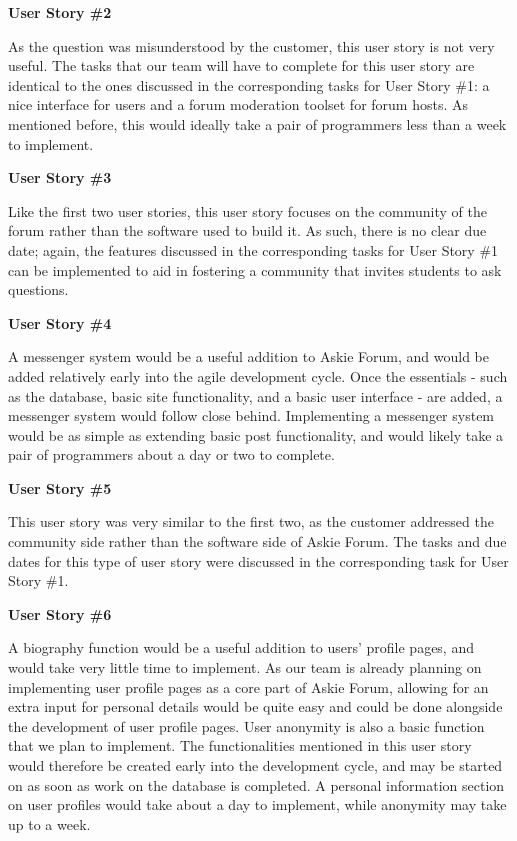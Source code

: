 \documentclass[12pt]{article}
\begin{document}
\textbf{User Story \#2}
\begin{flushleft}
As the question was misunderstood by the customer, this user story is not very useful. The tasks that our team will have to complete for this user story are identical to the ones discussed in the corresponding tasks for User Story \#1: a nice interface for users and a forum moderation toolset for forum hosts. As mentioned before, this would ideally take a pair of programmers less than a week to implement.
\newline
\end{flushleft}

\textbf{User Story \#3}
\begin{flushleft}
Like the first two user stories, this user story focuses on the community of the forum rather than the software used to build it. As such, there is no clear due date; again, the features discussed in the corresponding tasks for User Story \#1 can be implemented to aid in fostering a community that invites students to ask questions.
\newline
\end{flushleft}

\textbf{User Story \#4}
\begin{flushleft}
A messenger system would be a useful addition to Askie Forum, and would be added relatively early into the agile development cycle. Once the essentials - such as the database, basic site functionality, and a basic user interface - are added, a messenger system would follow close behind. Implementing a messenger system would be as simple as extending basic post functionality, and would likely take a pair of programmers about a day or two to complete.
\newline
\end{flushleft}

\textbf{User Story \#5}
\begin{flushleft}
This user story was very similar to the first two, as the customer addressed the community side rather than the software side of Askie Forum. The tasks and due dates for this type of user story were discussed in the corresponding task for User Story \#1.
\newline
\end{flushleft}

\textbf{User Story \#6}
\begin{flushleft}
A biography function would be a useful addition to users' profile pages, and would take very little time to implement. As our team is already planning on implementing user profile pages as a core part of Askie Forum, allowing for an extra input for personal details would be quite easy and could be done alongside the development of user profile pages. User anonymity is also a basic function that we plan to implement. The functionalities mentioned in this user story would therefore be created early into the development cycle, and may be started on as soon as work on the database is completed. A personal information section on user profiles would take about a day to implement, while anonymity may take up to a week.
\newline
\end{flushleft}
\end{document}
